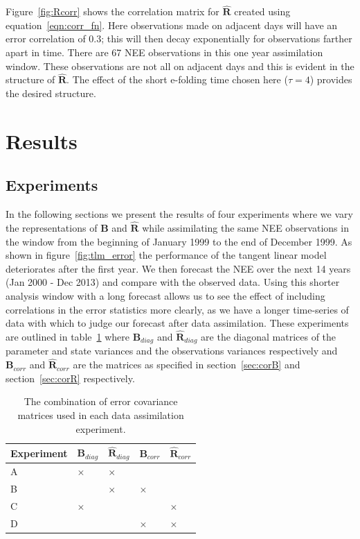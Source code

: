 \documentclass[review]{elsarticle}
\begin{document}
Figure~\ref{fig:Rcorr} shows the correlation matrix for $\hat{\mathbf{R}}$ created using equation~\eqref{eqn:corr_fn}. Here observations made on adjacent days will have an error correlation of 0.3; this will then decay exponentially for observations farther apart in time. There are 67 NEE observations in this one year assimilation window. These observations are not all on adjacent days and this is evident in the structure of $\hat{\mathbf{R}}$. The effect of the short e-folding time chosen here ($\tau=4$) provides the desired structure. 

\section{Results} \label{sec:results}

\subsection{Experiments} \label{sec:exps}

In the following sections we present the results of four experiments where we vary the representations of $\textbf{B}$ and $\hat{\mathbf{R}}$ while assimilating the same NEE observations in the window from the beginning of January 1999 to the end of December 1999. As shown in figure~\ref{fig:tlm_error} the performance of the tangent linear model deteriorates after the first year. We then forecast the NEE over the next 14 years (Jan 2000 - Dec 2013) and compare with the observed data. Using this shorter analysis window with a long forecast allows us to see the effect of including correlations in the error statistics more clearly, as we have a longer time-series of data with which to judge our forecast after data assimilation. These experiments are outlined in table~\ref{table:exps_tab} where $\textbf{B}_{diag}$ and $\hat{\mathbf{R}}_{diag}$ are the diagonal matrices of the parameter and state variances and the observations variances respectively and $\textbf{B}_{corr}$ and $\hat{\mathbf{R}}_{corr}$ are the matrices as specified in section~\ref{sec:corB} and section~\ref{sec:corR} respectively.

\begin{table}[ht] 
\begin{center}
	\begin{tabular}{| l | l | l | l | l |}
	\hline
	Experiment & $\textbf{B}_{diag}$ & $\hat{\mathbf{R}}_{diag}$ & $\textbf{B}_{corr}$ &
	$\hat{\mathbf{R}}_{corr}$ \\ \hline
	A & $\times$ & $\times$ & & \\ \hline
	B & & $\times$ & $\times$ & \\ \hline
	C & $\times$ & & & $\times$ \\ \hline
	D & & & $\times$ & $\times$ \\ 
	\hline
	\end{tabular}
	\caption{The combination of error covariance matrices used in each data assimilation experiment.}
	\label{table:exps_tab}
\end{center} 
\end{table}
\end{document}
